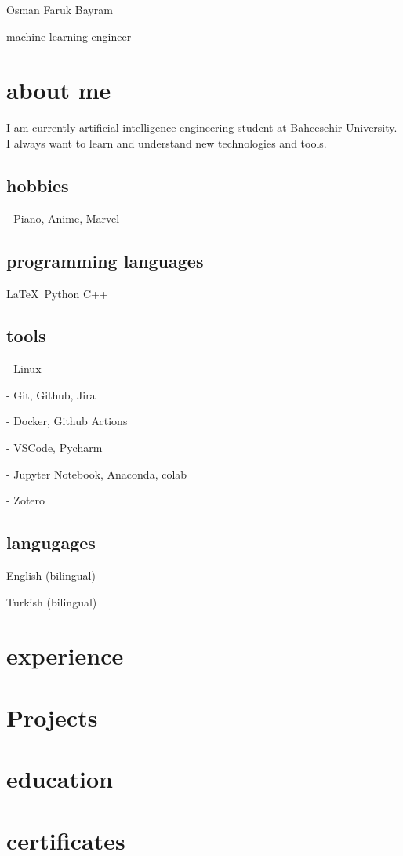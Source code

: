 \documentclass{resume-class} %
\begin{document}
\begin{center}
    Osman Faruk Bayram
\end{center}
machine learning engineer




\section{about me}

I am currently artificial intelligence engineering student at Bahcesehir University. I always want to learn and understand new technologies and tools.

\subsection{hobbies}

- Piano, Anime, Marvel


\subsection{programming languages}

\LaTeX\ Python C++

\subsection{tools}

- Linux

- Git, Github, Jira

- Docker, Github Actions

- VSCode, Pycharm

- Jupyter Notebook, Anaconda, colab

- Zotero


\subsection{langugages}

English (bilingual)

Turkish (bilingual)

\makeprofile

\section{experience}
\blindtext

\section{Projects}
\blindtext

\section{education}
\blindtext

\section{certificates}
\blindtext



\footer
\end{document}
